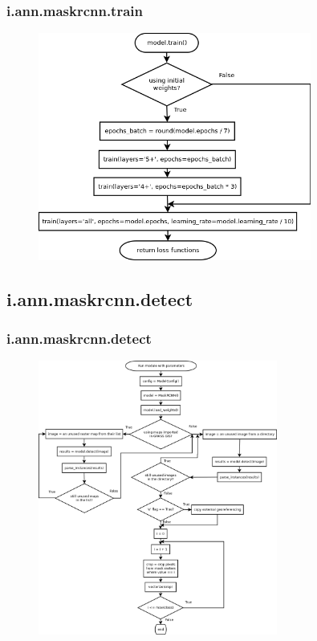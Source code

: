 \documentclass{beamer}
\begin{document}

\begin{frame}

\frametitle{i.ann.maskrcnn.train}

\begin{figure}[ht]
	\includegraphics[width=0.8\textwidth]{pictures/training_dia.png}
\end{figure}
\end{frame}


\subsection{i.ann.maskrcnn.detect}

\begin{frame}

\frametitle{i.ann.maskrcnn.detect}

\begin{figure}[ht]
	\includegraphics[width=0.7\textwidth]{pictures/detect_dia.png}
\end{figure}
\end{frame}
\end{document}
